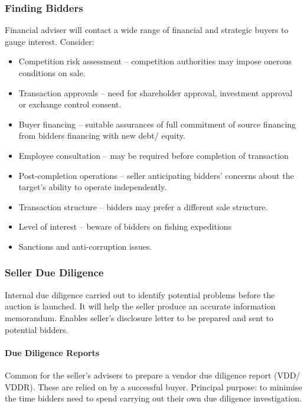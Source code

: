 \documentclass[
]{article}
\providecommand{\tightlist}{%
  \setlength{\itemsep}{0pt}\setlength{\parskip}{0pt}}
\begin{document}
\hypertarget{finding-bidders}{%
\subsubsection{Finding Bidders}\label{finding-bidders}}

Financial adviser will contact a wide range of financial and strategic
buyers to gauge interest. Consider:

\begin{itemize}
\tightlist
\item
  Competition risk assessment -- competition authorities may impose
  onerous conditions on sale.
\item
  Transaction approvals -- need for shareholder approval, investment
  approval or exchange control consent.
\item
  Buyer financing -- suitable assurances of full commitment of source
  financing from bidders financing with new debt/ equity.
\item
  Employee consultation -- may be required before completion of
  transaction
\item
  Post-completion operations -- seller anticipating bidders' concerns
  about the target's ability to operate independently.
\item
  Transaction structure -- bidders may prefer a different sale
  structure.
\item
  Level of interest -- beware of bidders on fishing expeditions
\item
  Sanctions and anti-corruption issues.
\end{itemize}

\hypertarget{seller-due-diligence}{%
\subsubsection{Seller Due Diligence}\label{seller-due-diligence}}

Internal due diligence carried out to identify potential problems before
the auction is launched. It will help the seller produce an accurate
information memorandum. Enables seller's disclosure letter to be
prepared and sent to potential bidders.

\hypertarget{due-diligence-reports}{%
\paragraph{Due Diligence Reports}\label{due-diligence-reports}}

Common for the seller's advisers to prepare a vendor due diligence
report (VDD/ VDDR). These are relied on by a successful buyer. Principal
purpose: to minimise the time bidders need to spend carrying out their
own due diligence investigation.
\end{document}
